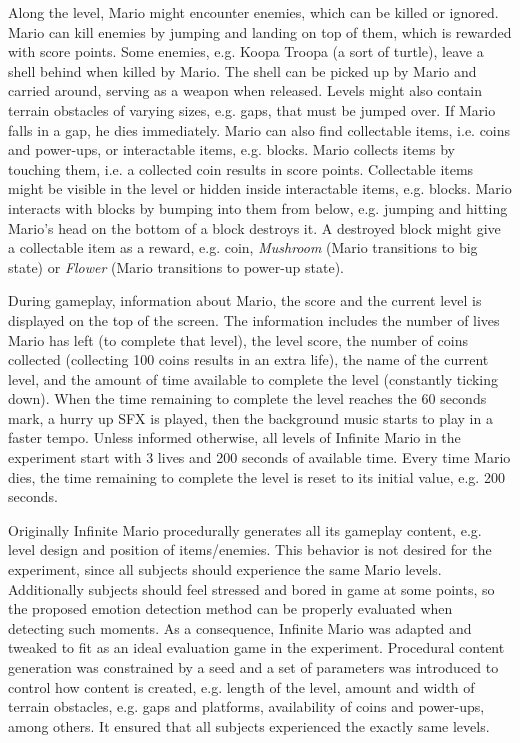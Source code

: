 Along the level, Mario might encounter enemies, which can be killed or ignored. Mario can kill enemies by jumping and landing on top of them, which is rewarded with score points. Some enemies, e.g. Koopa Troopa (a sort of turtle), leave a shell behind when killed by Mario. The shell can be picked up by Mario and carried around, serving as a weapon when released. Levels might also contain terrain obstacles of varying sizes, e.g. gaps, that must be jumped over. If Mario falls in a gap, he dies immediately. Mario can also find collectable items, i.e. coins and power-ups, or interactable items, e.g. blocks. Mario collects items by touching them, i.e. a collected coin results in score points. Collectable items might be visible in the level or hidden inside interactable items, e.g. blocks. Mario interacts with blocks by bumping into them from below, e.g. jumping and hitting Mario's head on the bottom of a block destroys it. A destroyed block might give a collectable item as a reward, e.g. coin, \textit{Mushroom} (Mario transitions to big state) or \textit{Flower} (Mario transitions to power-up state).

During gameplay, information about Mario, the score and the current level is displayed on the top of the screen. The information includes the number of lives Mario has left (to complete that level), the level score, the number of coins collected (collecting 100 coins results in an extra life), the name of the current level, and the amount of time available to complete the level (constantly ticking down). When the time remaining to complete the level reaches the 60 seconds mark, a hurry up SFX is played, then the background music starts to play in a faster tempo. Unless informed otherwise, all levels of Infinite Mario in the experiment start with 3 lives and 200 seconds of available time. Every time Mario dies, the time remaining to complete the level is reset to its initial value, e.g. 200 seconds.

Originally Infinite Mario procedurally generates all its gameplay content, e.g. level design and position of items/enemies. This behavior is not desired for the experiment, since all subjects should experience the same Mario levels. Additionally subjects should feel stressed and bored in game at some points, so the proposed emotion detection method can be properly evaluated when detecting such moments. As a consequence, Infinite Mario was adapted and tweaked to fit as an ideal evaluation game in the experiment. Procedural content generation was constrained by a seed and a set of parameters was introduced to control how content is created, e.g. length of the level, amount and width of terrain obstacles, e.g. gaps and platforms, availability of coins and power-ups, among others. It ensured that all subjects experienced the exactly same levels.

